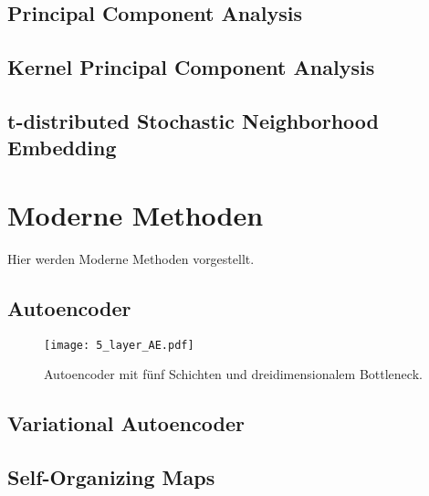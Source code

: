 \subsection{Principal Component Analysis}
\label{ch:MethodenDerDimRed:traditionell:PCA}

\subsection{Kernel Principal Component Analysis}
\label{ch:MethodenDerDimRed:traditionell:kPCA}

\subsection{t-distributed Stochastic Neighborhood Embedding}
\label{ch:MethodenDerDimRed:traditionell:t-SNE}

\newpage

\section{Moderne Methoden}
\label{ch:MethodenDerDimRed:modern}
Hier werden Moderne Methoden vorgestellt.

\subsection{Autoencoder}
\label{ch:MethodenDerDimRed:modern:AE}

\begin{figure}[h]
	\label{fig:5-layer-Autoencoder}
	\begin{center}
		\texttt{[image: 5\_layer\_AE.pdf]}
		\caption{Autoencoder mit fünf Schichten und dreidimensionalem Bottleneck.}
	\end{center}
\end{figure}

\subsection{Variational Autoencoder}
\label{ch:MethodenDerDimRed:modern:VAE}

\subsection{Self-Organizing Maps}
\label{ch:MethodenDerDimRed:modern:SOM}
